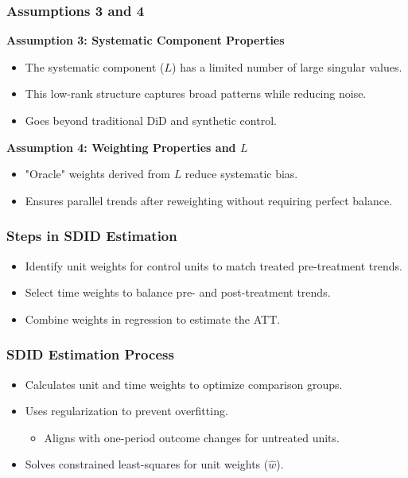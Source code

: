 \documentclass{beamer}
\begin{document}
\begin{frame}
\frametitle{Assumptions 3 and 4}

\textbf{Assumption 3: Systematic Component Properties}
\begin{itemize}
    \item The systematic component ($L$) has a limited number of large singular values.
    \item This low-rank structure captures broad patterns while reducing noise.
    \item Goes beyond traditional DiD and synthetic control.
\end{itemize}

\vspace{0.5cm}

\textbf{Assumption 4: Weighting Properties and $L$}
\begin{itemize}
    \item "Oracle" weights derived from $L$ reduce systematic bias.
    \item Ensures parallel trends after reweighting without requiring perfect balance.
\end{itemize}

\end{frame}






\begin{frame}
\frametitle{Steps in SDID Estimation}

\begin{itemize}
    \item Identify unit weights for control units to match treated pre-treatment trends.
    \item Select time weights to balance pre- and post-treatment trends.
    \item Combine weights in regression to estimate the ATT.
\end{itemize}

\end{frame}



\begin{frame}
\frametitle{SDID Estimation Process}

\begin{itemize}
    \item Calculates unit and time weights to optimize comparison groups.
    \item Uses regularization to prevent overfitting.
        \begin{itemize}
            \item Aligns with one-period outcome changes for untreated units.
        \end{itemize}
    \item Solves constrained least-squares for unit weights (\(\hat{w}\)).
\end{itemize}

\end{frame}
\end{document}
